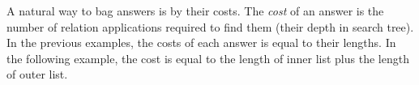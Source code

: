 \documentclass[format=acmlarge, review=true, authordraft=true]{acmart}
\begin{document}
A natural way to bag answers is by their costs. The \emph{cost} of an answer is the number of relation applications required to find them (their depth in search tree). In the previous examples, the costs of each answer is equal to their lengths. In the following example, the cost is equal to the length of inner list plus the length of outer list.

\begin{center}
	\begin{tabular}{c}
		
	\end{tabular}
\end{center}

% 
% 
% 
%   
% 
%   
% 
% 
\end{document}
